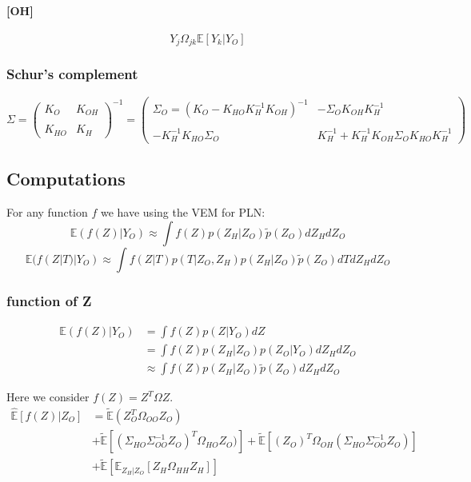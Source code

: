 \documentclass[11pt,a4paper]{article}
\newcommand{\Esp}{\mathds{E}}
\begin{document}
\paragraph{[OH]}$$ Y_j\Omega_{jk}\Esp[Y_k|Y_O]$$

\subsubsection{Schur's complement}

\[
 \Sigma=
  \left( {\begin{array}{cc}
  K_O &  K_{OH}\\\\
  K_{HO} & K_H
  \end{array} } \right)^{-1} =
  \left( {\begin{array}{cc}
  \Sigma_O =( K_O - K_{HO}K_H^{-1}K_{OH})^{-1} &  - \Sigma_O K_{OH}K_H^{-1}\\\\
 -K_H^{-1}K_{HO}\Sigma_O & K_H^{-1}+K_H^{-1}K_{OH}\Sigma_OK_{HO}K_H^{-1}
  \end{array} } \right)
  \]
\subsection{Computations}

For any function $f$ we have using the VEM for PLN:
$$\Esp(f(Z)|Y_O)  \approx \int f(Z) p(Z_H|Z_O)\tilde{p}(Z_O) dZ_H dZ_O$$
$$\Esp(f(Z|T)|Y_O)  \approx \int f(Z|T) p(T|Z_O,Z_H) p(Z_H|Z_O)\tilde{p}(Z_O) dT dZ_H dZ_O$$
\subsubsection{ function of Z}
\begin{align*}
\Esp(f(Z)|Y_O) &=\int f(Z) p(Z|Y_O) dZ\\
&=\int f(Z) p(Z_H|Z_O) p(Z_O|Y_O) dZ_H dZ_O\\
&\approx \int f(Z) p(Z_H|Z_O)\tilde{p}(Z_O) dZ_H dZ_O
\end{align*}


 Here we consider $f(Z) = Z^T\Omega Z$.
\begin{align*}
\widehat{\Esp}[f(Z)|Z_O] &= \tilde{\Esp}(Z_O^T\Omega_{OO}Z_O)\\
& +\tilde{\Esp}\left[(\Sigma_{HO}\Sigma_{OO}^{-1} Z_O)^T \Omega_{HO}Z_O)\right] +\tilde{\Esp}\left[(Z_O)^T \Omega_{OH} (\Sigma_{HO}\Sigma_{OO}^{-1} Z_O)\right]\\
&+ \tilde{\Esp}\left[\Esp_{Z_H|Z_O} [Z_H\Omega_{HH}Z_H]\right]
\end{align*}
\end{document}
